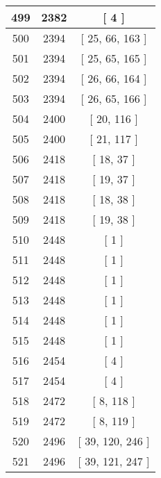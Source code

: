 \begin{center}
\begin{longtable}[H]{|| c c c ||}
499 & 2382 & [ 4 ] \\ 
\hline
500 & 2394 & [ 25, 66, 163 ] \\ 
\hline
501 & 2394 & [ 25, 65, 165 ] \\ 
\hline
502 & 2394 & [ 26, 66, 164 ] \\ 
\hline
503 & 2394 & [ 26, 65, 166 ] \\ 
\hline
504 & 2400 & [ 20, 116 ] \\ 
\hline
505 & 2400 & [ 21, 117 ] \\ 
\hline
506 & 2418 & [ 18, 37 ] \\ 
\hline
507 & 2418 & [ 19, 37 ] \\ 
\hline
508 & 2418 & [ 18, 38 ] \\ 
\hline
509 & 2418 & [ 19, 38 ] \\ 
\hline
510 & 2448 & [ 1 ] \\ 
\hline
511 & 2448 & [ 1 ] \\ 
\hline
512 & 2448 & [ 1 ] \\ 
\hline
513 & 2448 & [ 1 ] \\ 
\hline
514 & 2448 & [ 1 ] \\ 
\hline
515 & 2448 & [ 1 ] \\ 
\hline
516 & 2454 & [ 4 ] \\ 
\hline
517 & 2454 & [ 4 ] \\ 
\hline
518 & 2472 & [ 8, 118 ] \\ 
\hline
519 & 2472 & [ 8, 119 ] \\ 
\hline
520 & 2496 & [ 39, 120, 246 ] \\ 
\hline
521 & 2496 & [ 39, 121, 247 ] \\ 
\hline
\end{longtable}
\end{center}
